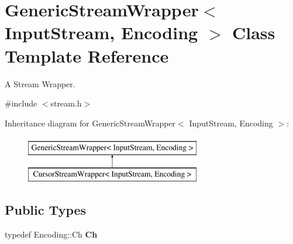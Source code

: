 \hypertarget{classGenericStreamWrapper}{}\section{Generic\+Stream\+Wrapper$<$ Input\+Stream, Encoding $>$ Class Template Reference}
\label{classGenericStreamWrapper}


A Stream Wrapper.  




{\ttfamily \#include $<$stream.\+h$>$}

Inheritance diagram for Generic\+Stream\+Wrapper$<$ Input\+Stream, Encoding $>$\+:\begin{figure}[H]
\begin{center}
\leavevmode
\includegraphics[height=2.000000cm]{classGenericStreamWrapper}
\end{center}
\end{figure}
\subsection*{Public Types}
\begin{DoxyCompactItemize}
\item 
typedef Encoding\+::\+Ch {\bfseries Ch}\hypertarget{classGenericStreamWrapper_aef9e89bc4997497315bde1b60e8bb848}{}\label{classGenericStreamWrapper_aef9e89bc4997497315bde1b60e8bb848}

\end{DoxyCompactItemize}
